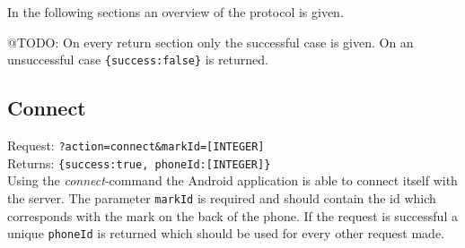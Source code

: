 \documentclass[a4paper,10pt]{article}
\begin{document}
In the following sections an overview of the protocol is given.

@TODO: On every return section only the successful case is given. On an unsuccessful case \texttt{\{success:false\}} is returned.

\subsection{Connect}
Request: \texttt{?action=connect\&markId=[INTEGER]} \\
Returns: \texttt{\{success:true, phoneId:[INTEGER]\}} \\

\noindent Using the \emph{connect}-command the Android application is able to connect itself with the server.
The parameter \texttt{markId} is required and should contain the id which corresponds with the mark on the back of the phone.
If the request is successful a unique \texttt{phoneId} is returned which should be used for every other request made.
\end{document}
